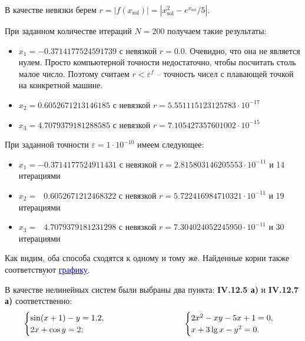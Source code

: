 		В качестве невязки берем $r = |f(x_{\text{sol}})| = |x_\text{sol}^2 - e^{x_\text{sol}} / 5|$.
		
		
		\newpage
		При заданном количестве итераций $N = 200$ получаем такие результаты:
		\begin{itemize}
			\item $x_1 = -0.3714177524591739$ с невязкой $r = 0.0$. Очевидно, что она не является нулем. Просто компьютерной точности недостаточно, чтобы посчитать столь малое число. Поэтому считаем $r < \varepsilon^f$ -- точность чисел с плавающей точкой на конкретной машине. 
			
			
			\item $x_2 =  0.6052671213146185$ с невязкой $r = 5.551115123125783 \cdot 10^{-17}$
			
			\item $x_3 =  4.7079379181288585$ с невязкой $r = 7.105427357601002 \cdot 10^{-15}$
		\end{itemize}
	
		При заданной точности $\varepsilon = 1 \cdot 10^{-10}$ имеем следующее:
		\begin{itemize}
			\item $x_1 = -0.3714177524911431$ с невязкой $r = 2.815803146205553 \cdot 10^{-11}$ и 14 итерациями
			
			\item $x_2 = \;\;\, 0.6052671212468322$ с невязкой $r = 5.722416984710321 \cdot 10^{-11}$ и 19 итерациями
			
			\item $x_3 = \;\;\, 4.7079379181231298$ с невязкой $r = 7.304024052245950 \cdot 10^{-11}$ и 30 итерациями
		\end{itemize}
		
		
		Как видим, оба способа сходятся к одному и тому же. Найденные корни также соответствуют \hyperref[x2]{\textcolor{blue}{графику}}.
		
		
		
		\newpage
		
		В качестве нелинейных систем были выбраны два пункта: \textbf{IV.12.5 а)} и \textbf{IV.12.7 а)} соответственно:
		\begin{equation*}
			\begin{cases}
				\sin(x + 1) - y = 1.2,\\
				2x + \cos y = 2;
			\end{cases}
			\hspace{30mm}
			\begin{cases}
				2x^2 - xy - 5x + 1 = 0,\\
				x + 3\lg x - y^2 = 0.
			\end{cases}
		\end{equation*}
	

